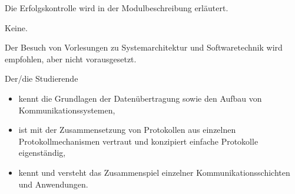 \begin{course}

\setdoclanguagegerman
{}



\coursehead


\label{cour_8645.dp_997}


\begin{styleenv}
\begin{assessment}
Die Erfolgskontrolle wird in der Modulbeschreibung erläutert.


\end{assessment}

\begin{conditions}Keine.\end{conditions}

\begin{recommendations}Der Besuch von Vorlesungen zu Systemarchitektur und Softwaretechnik wird empfohlen, aber nicht vorausgesetzt.

\end{recommendations}
\end{styleenv}

\begin{learningoutcomes}
Der/die Studierende

 \begin{itemize}\item  kennt die Grundlagen der Datenübertragung sowie den Aufbau von Kommunikationssystemen,  \item ist mit der Zusammensetzung von Protokollen aus einzelnen Protokollmechanismen vertraut und konzipiert einfache Protokolle eigenständig,  \item  kennt und versteht das Zusammenspiel einzelner Kommunikationsschichten und Anwendungen.  \end{itemize}
\end{learningoutcomes}


\end{course}

